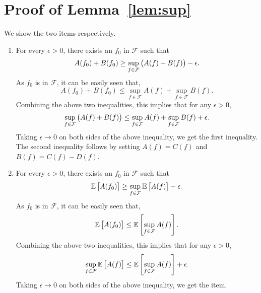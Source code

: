 \documentclass{article}
\newcommand{\EE}{\mathbb{E}}
\newcommand{\Fcal}{\mathcal{F}}
\begin{document}
\section{Proof of Lemma~\ref{lem:sup}}
\label{app:pf}
We show the two items respectively.
  \begin{enumerate}
    \item For every $\epsilon>0$, there exists an $f_0$ in $\Fcal$ such that
    \[ A(f_0) + B(f_0) \geq \sup_{f \in \Fcal}\del{A(f) + B(f)} - \epsilon. \]
    As $f_0$ is in $\Fcal$, it can be easily seen that,
    \[ A(f_0) + B(f_0) \leq \sup_{f \in \Fcal} A(f) + \sup_{f \in \Fcal} B(f). \]
    Combining the above two inequalities, this implies that for any $\epsilon>0$,
    \[ \sup_{f \in \Fcal}\del{A(f) + B(f)} \leq \sup_{f \in \Fcal} A(f) + \sup_{f \in \Fcal} B(f) + \epsilon. \]
    Taking $\epsilon \to 0$ on both sides of the above inequality, we get the first inequality. The second inequality follows by setting $A(f) = C(f)$ and $B(f) = C(f) - D(f)$.

    \item For every $\epsilon>0$, there exists an $f_0$ in $\Fcal$ such that
    \[ \EE \sbr{A(f_0)} \geq \sup_{f \in \Fcal} \EE \sbr{A(f)} - \epsilon. \]
    As $f_0$ is in $\Fcal$, it can be easily seen that,
    \[ \EE \sbr{A(f_0)} \leq \EE \sbr{\sup_{f \in \Fcal} A(f)}. \]
    Combining the above two inequalities, this implies that for any $\epsilon>0$,
    \[ \sup_{f \in \Fcal} \EE \sbr{A(f)} \leq \EE \sbr{\sup_{f \in \Fcal} A(f)} + \epsilon. \]
    Taking $\epsilon \to 0$ on both sides of the above inequality, we get the item.
  \end{enumerate}
\end{document}
